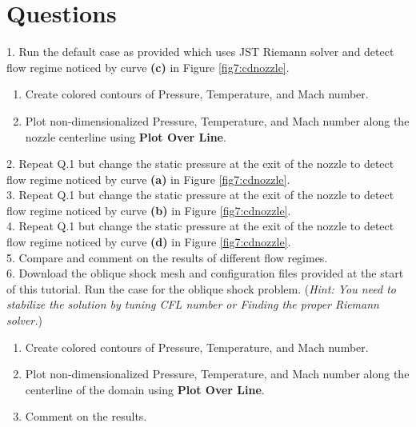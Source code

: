 \section{Questions}
1. Run the default case as provided which uses JST Riemann solver and detect flow regime noticed by curve \textbf{(c)} in Figure \ref{fig7:cdnozzle}.
\begin{enumerate}[label=(\alph*)]
	\item Create colored contours of Pressure, Temperature, and Mach number.
	\item Plot non-dimensionalized Pressure, Temperature, and Mach number along the nozzle centerline using \textbf{Plot Over Line}.
\end{enumerate}
2. Repeat Q.1 but change the static pressure at the exit of the nozzle to detect flow regime noticed by curve \textbf{(a)} in Figure \ref{fig7:cdnozzle}.\\
3. Repeat Q.1 but change the static pressure at the exit of the nozzle to detect flow regime noticed by curve \textbf{(b)} in Figure \ref{fig7:cdnozzle}.\\
4. Repeat Q.1 but change the static pressure at the exit of the nozzle to detect flow regime noticed by curve \textbf{(d)} in Figure \ref{fig7:cdnozzle}.\\
5. Compare and comment on the results of different flow regimes.\\
6. Download the oblique shock mesh and configuration files provided at the start of this tutorial. Run the case for the oblique shock problem.
(\textit{Hint: You need to stabilize the solution by tuning CFL number or Finding the proper Riemann solver.})
\begin{enumerate}[label=(\alph*)]
	\item Create colored contours of Pressure, Temperature, and Mach number.
	\item Plot non-dimensionalized Pressure, Temperature, and Mach number along the centerline of the domain using \textbf{Plot Over Line}.
	\item Comment on the results.
\end{enumerate}


